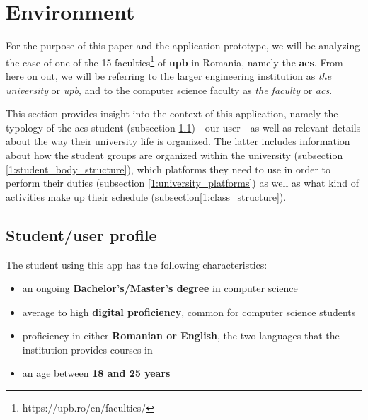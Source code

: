 \section{Environment} \label{1:environment}

    For the purpose of this paper and the application prototype, we will be analyzing the case of one of the 15 faculties\footnote{https://upb.ro/en/faculties/} of \textbf{\acrlong{upb}} in Romania, namely the \textbf{\acrlong{acs}}. From here on out, we will be referring to the larger engineering institution as \textit{the university} or \textit{\acrshort{upb}}, and to the computer science faculty as \textit{the faculty} or \textit{\acrshort{acs}}.
    
    This section provides insight into the context of this application, namely the typology of the \acrshort{acs} student (subsection \ref{2:student_profile}) - our user - as well as relevant details about the way their university life is organized. The latter includes information about how the student groups are organized within the university (subsection \ref{1:student_body_structure}), which platforms they need to use in order to perform their duties (subsection \ref{1:university_platforms}) as well as what kind of activities make up their schedule (subsection\ref{1:class_structure}).
    
    \subsection{Student/user profile} \label{2:student_profile}
    
        The student using this app has the following characteristics:
        \begin{itemize}
            \setlength{\topsep}{0.5pt}
            \setlength{\itemsep}{0.5pt}
            \setlength{\parsep}{0.5pt}
            \item an ongoing \textbf{Bachelor's/Master's degree} in computer science
            \item average to high \textbf{digital proficiency}, common for computer science students%
            \item proficiency in either \textbf{Romanian or English}, the two languages that the institution provides courses in%
            \item an age between \textbf{18 and 25 years}
        \end{itemize}
        
